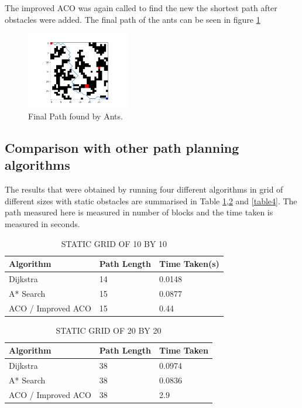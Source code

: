 \documentclass[conference]{IEEEtran}
\begin{document}
The improved ACO was again called to find the new the shortest path after obstacles were added. The final path of the ants can be seen in figure \ref{fig9}
\begin{figure}[H]
    \centering
    \includegraphics[width=0.4\textwidth]{30x30 grid (ACO Dynamic 3).png}
    \caption{Final Path found by Ants.}
    \label{fig9}
\end{figure}
\subsection{Comparison with other path planning algorithms}
The results that were obtained by running four different algorithms in grid of different sizes with static obstacles are summarised in Table \ref{table2},\ref{table3} and \ref{table4}. The path measured here is measured in number of blocks and the time taken is measured in seconds.

\begin{table}[H]
\caption{STATIC GRID OF 10 BY 10}
\begin{center}
\begin{tabular}{|l|l|l|}
\hline
Algorithm          & Path   Length & Time   Taken(s) \\ \hline
Dijkstra          & 14            & 0.0148          \\ \hline
A*   Search        & 15            & 0.0877          \\ \hline
ACO / Improved ACO & 15            & 0.44            \\ \hline
\end{tabular}
\label{table2}
\end{center}
\end{table}

\begin{table}[H]
\caption{STATIC GRID OF 20 BY 20}
\begin{center}
\begin{tabular}{|l|l|l|}
\hline
Algorithm          & Path   Length & Time   Taken \\ \hline
Dijkstra          & 38            & 0.0974                   \\ \hline
A*   Search        & 38            & 0.0836                   \\ \hline
ACO / Improved ACO & 38            & 2.9                      \\ \hline
\end{tabular}
\label{table3}
\end{center}
\end{table}
\end{document}
